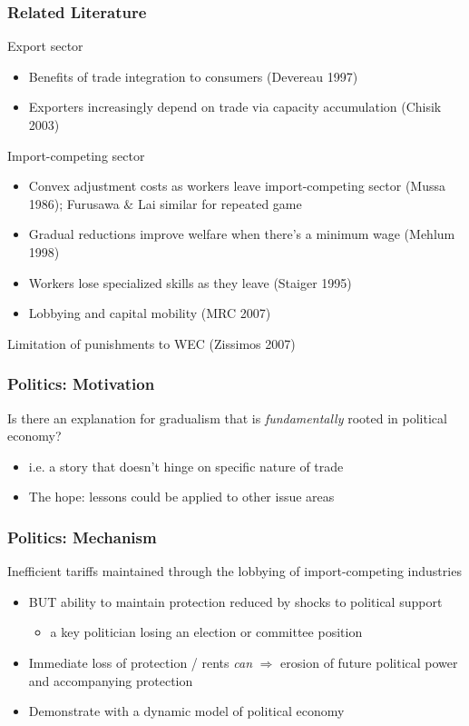 \documentclass[handout]{beamer}
\begin{document}
\begin{frame}
\frametitle{Related Literature}

\pause
Export sector
\begin{itemize}
  \item \footnotesize Benefits of trade integration to consumers (Devereau 1997)
  \item \footnotesize Exporters increasingly depend on trade via capacity accumulation (Chisik 2003)
\end{itemize}

\pause
Import-competing sector
\begin{itemize}
  \item \footnotesize Convex adjustment costs as workers leave import-competing sector (Mussa 1986); Furusawa $\&$ Lai similar for repeated game
	\item \footnotesize Gradual reductions improve welfare when there's a minimum wage (Mehlum 1998)
	\item \footnotesize Workers lose specialized skills as they leave (Staiger 1995)
	\item \footnotesize Lobbying and capital mobility (MRC 2007)
\end{itemize}

\pause
Limitation of punishments to WEC (Zissimos 2007)

\end{frame}


\begin{frame}
\frametitle{Politics: Motivation}

\pause
Is there an explanation for gradualism that is \textit{fundamentally} rooted in political economy?
\pause
\begin{itemize}
	\item i.e. a story that doesn't hinge on specific nature of trade
	\pause
	\item The hope: lessons could be applied to other issue areas
\end{itemize}

\end{frame}


\begin{frame}
\frametitle{Politics: Mechanism}

\pause
Inefficient tariffs maintained through the lobbying of import-competing industries
\pause
\begin{itemize}[<+->]
	\item BUT ability to maintain protection reduced by shocks to political support
		\begin{itemize}
			\item a key politician losing an election or committee position
		\end{itemize}
	\item Immediate loss of protection / rents \textit{can} $\Rightarrow$ erosion of future political power and accompanying protection
	\item Demonstrate with a dynamic model of political economy
\end{itemize}

\end{frame}
\end{document}
